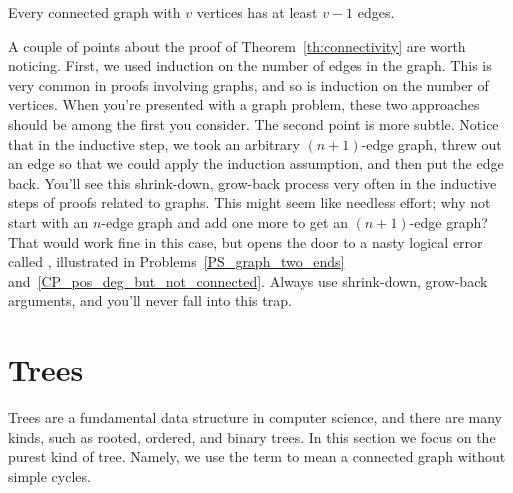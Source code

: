 \begin{corollary}
\label{cor:n-1}
Every connected graph with $v$ vertices has at least $v - 1$ edges.
\end{corollary}

A couple of points about the proof of Theorem~\ref{th:connectivity} are
worth noticing.  First, we used induction on the number of
edges in the graph.  This is very common in proofs involving graphs, and
so is induction on the number of vertices.  When you're presented with a
graph problem, these two approaches should be among the first you
consider.  The second point is more subtle.  Notice that in the inductive
step, we took an arbitrary $(n+1)$-edge graph, threw out an edge so that
we could apply the induction assumption, and then put the edge back.
You'll see this shrink-down, grow-back process very often in the inductive
steps of proofs related to graphs.  This might seem like needless effort;
why not start with an $n$-edge graph and add one more to get an
$(n+1)$-edge graph?  That would work fine in this case, but opens the door
to a nasty logical error called , illustrated in
Problems~\ref{PS_graph_two_ends} and~\ref{CP_pos_deg_but_not_connected}.
Always use shrink-down, grow-back arguments, and you'll never fall into
this trap.


\begin{problems}
\classproblems
{}
\homeworkproblems
{}


\homeworkproblems
{}
\end{problems}


\section{Trees}\label{trees-sec}
Trees are a fundamental data structure in computer science, and there are
many kinds, such as rooted, ordered, and binary trees.  In this section
we focus on the purest kind of tree.  Namely, we use the term  to
mean a connected graph without simple cycles.

